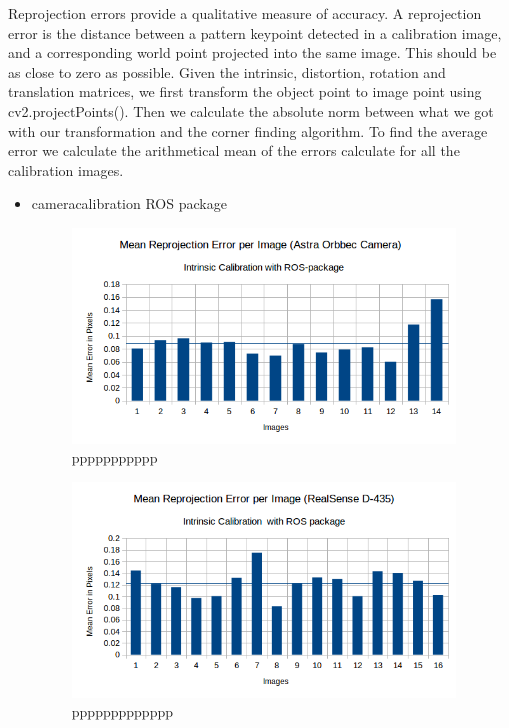 Reprojection errors provide a qualitative measure of accuracy. A reprojection error is the distance between a pattern keypoint detected in a calibration image, and a corresponding world point projected into the same image. This should be as close to zero as possible.
Given the intrinsic, distortion, rotation and translation matrices, we first transform the object point to image point using cv2.projectPoints(). Then we calculate the absolute norm between what we got with our transformation and the corner finding algorithm. To find the average error we calculate the arithmetical mean of the errors calculate for all the calibration images.
\begin{itemize}

\item camera\textunderscore calibration ROS package

\begin{figure}[!h]
\begin{center}
\includegraphics[width=4in]{figures05/ros_int_cal_astra.png}
\caption{ppppppppppp}%
\label{fig:target0}
\end{center}
\end{figure}

\begin{figure}[!h]
\begin{center}
\includegraphics[width=4in]{figures05/ros_int_cal_real.png}
\caption{ppppppppppppp}%
\label{fig:target0}
\end{center}
\end{figure}


\end{itemize}
